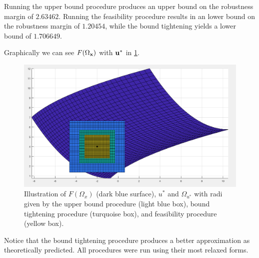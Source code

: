 Running the upper bound procedure produces an upper bound on the robustness margin of $2.63462$. Running the feasibility procedure results in an lower bound on the robustness margin of $1.20454$, while the bound tightening yields a lower bound of $1.706649$. 
 
Graphically we can see $F(\Omega_{\mathbf{x}})$ with $\mathbf{u}^*$ in \cref{fig:FOmega}.

\begin{figure}[htp!]
	\begin{center}
		\includegraphics[scale=0.45]{Figures/newex} %
	\end{center}
	\caption{Illustration of $F(\Omega_x)$ (dark blue surface), $u^*$ and $\Omega_{u^*}$ with radi given by the upper bound procedure (light blue box), bound tightening procedure (turquoise box), and feasibility procedure (yellow box).}
	\label{fig:FOmega}
\end{figure}

Notice that the bound tightening procedure produces a better approximation as theoretically predicted. All procedures were run using their most relaxed forms. 
